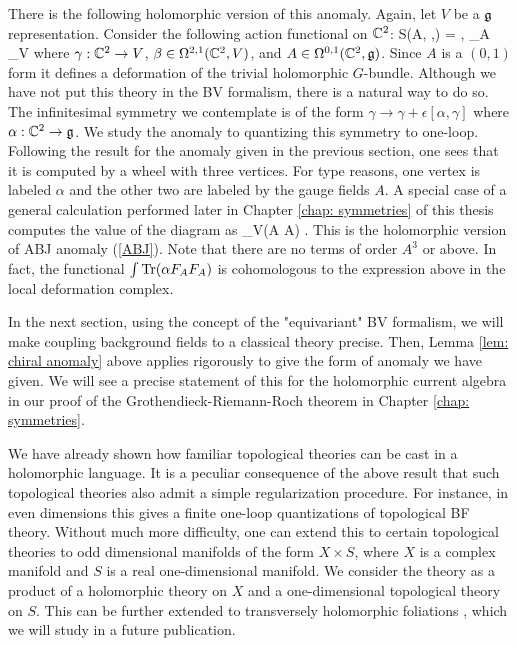 There is the following holomorphic version of this anomaly. 
Again, let $V$ be a $\mathfrak g$ representation.
Consider the following action functional on $\mathbb C^2$:
\ben
S(A, \beta,\gamma) = \int \<\beta, \dbar_A \gamma\>_V
\een
where $\gamma : \mathbb C^2 \to V$, $\beta \in \Omega^{2,1}(\mathbb C^2 , V)$, and $A \in \Omega^{0,1}(\mathbb C^2, \mathfrak g)$. 
Since $A$ is a $(0,1)$ form it defines a deformation of the trivial holomorphic $G$-bundle. 
Although we have not put this theory in the BV formalism, there is a natural way to do so. 
The infinitesimal symmetry we contemplate is of the form $\gamma \to \gamma + \epsilon [\alpha, \gamma]$ where $\alpha : \mathbb C^2 \to \mathfrak g$. 
We study the anomaly to quantizing this symmetry to one-loop.
Following the result for the anomaly given in the previous section, one sees that it is computed by a wheel with three vertices. 
For type reasons, one vertex is labeled $\alpha$ and the other two are labeled by the gauge fields $A$.
A special case of a general calculation performed later in Chapter \ref{chap: symmetries} of this thesis computes the value of the diagram as
\ben
{}_V(\alpha \partial A \partial A) .
\een
This is the holomorphic version of ABJ anomaly (\ref{ABJ}). 
Note that there are no terms of order $A^3$ or above. 
In fact, the functional $\int {\rm Tr}(\alpha F_A F_A)$ is cohomologous to the expression above in the local deformation complex.

\begin{rmk} 
In the next section, using the concept of the "equivariant" BV formalism, we will make coupling background fields to a classical theory precise. 
Then, Lemma \ref{lem: chiral anomaly} above applies rigorously to give the form of anomaly we have given. 
We will see a precise statement of this for the holomorphic current algebra in our proof of the Grothendieck-Riemann-Roch theorem in Chapter \ref{chap: symmetries}.
\end{rmk}

\begin{rmk} 
We have already shown how familiar topological theories can be cast in a holomorphic language.
It is a peculiar consequence of the above result that such topological theories also admit a simple regularization procedure. 
For instance, in even dimensions this gives a finite one-loop quantizations of topological BF theory. 
Without much more difficulty, one can extend this to certain topological theories to odd dimensional manifolds of the form $X \times S$, where $X$ is a complex manifold and $S$ is a real one-dimensional manifold. 
We consider the theory as a product of a holomorphic theory on $X$ and a one-dimensional topological theory on $S$. 
This can be further extended to transversely holomorphic foliations \cite{THF1,THF2}, which we will study in a future publication.
\end{rmk}

